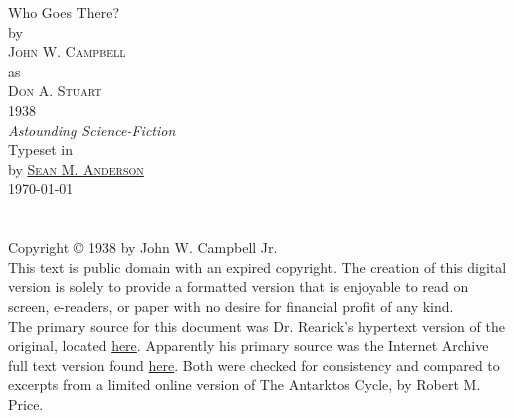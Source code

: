 \documentclass[ebook,oneside,11pt]{memoir}				%
\begin{document}
\frontmatter
\pagestyle{empty}
\begin{titlingpage}
\begin{center}
\vspace*{\fill}
{\maintitle Who Goes There?}\\\vspace{25pt}
{\large by}\\\vspace{25pt}
{\Large\textsc{John W. Campbell}}\\\vspace{5pt}
{\large as}\\\vspace{6pt}
{\Large\textsc{Don A. Stuart}}\\\vspace{25pt}
{\Large 1938\\\vspace{6pt}\emph{Astounding Science-Fiction}}\\
\vfill
Typeset in \XeLaTeX\\by {\href{http://www.roguephysicist.org}{\textsc{Sean M. Anderson}}}\\
\today
\vspace*{\fill}
\end{center}
\end{titlingpage}
\chapter*{}
\vspace*{\fill}
Copyright \copyright{} 1938 by John W. Campbell Jr.\\

\noindent This text is public domain with an expired copyright. The creation of this digital version is solely to provide a formatted version that is enjoyable to read on screen, e-readers, or paper with no desire for financial profit of any kind.\\

\noindent The primary source for this document was Dr. Rearick's hypertext version of the original, located \href{http://nzr.mvnu.edu/faculty/trearick/english/rearick/readings/manuscri/Who%20Goes%20There/Who%20Goes%20There%20Index.htm}{here}. Apparently his primary source was the Internet Archive full text version found \href{http://www.archive.org/stream/WhoGoesThere_414/WhoGoesThere.txt}{here}. Both were checked for consistency and compared to excerpts from a limited online version of The Antarktos Cycle, by Robert M. Price.
\clearpage
\tableofcontents*
\end{document}
